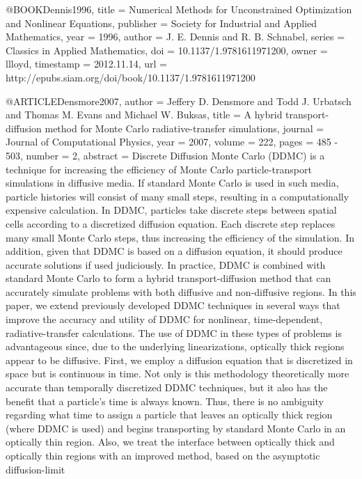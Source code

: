 {@BOOK{Dennis1996,
  title = {Numerical Methods for Unconstrained Optimization and Nonlinear Equations},
  publisher = {Society for Industrial and Applied Mathematics},
  year = {1996},
  author = {J. E. Dennis and R. B. Schnabel},
  series = {Classics in Applied Mathematics},
  doi = {10.1137/1.9781611971200},
  owner = {llloyd},
  timestamp = {2012.11.14},
  url = {http://epubs.siam.org/doi/book/10.1137/1.9781611971200}
}

@ARTICLE{Densmore2007,
  author = {Jeffery D. Densmore and Todd J. Urbatsch and Thomas M. Evans and
	Michael W. Buksas},
  title = {A hybrid transport-diffusion method for Monte Carlo radiative-transfer
	simulations},
  journal = {Journal of Computational Physics},
  year = {2007},
  volume = {222},
  pages = {485 - 503},
  number = {2},
  abstract = {Discrete Diffusion Monte Carlo (DDMC) is a technique for increasing
	the efficiency of Monte Carlo particle-transport simulations in diffusive
	media. If standard Monte Carlo is used in such media, particle histories
	will consist of many small steps, resulting in a computationally
	expensive calculation. In DDMC, particles take discrete steps between
	spatial cells according to a discretized diffusion equation. Each
	discrete step replaces many small Monte Carlo steps, thus increasing
	the efficiency of the simulation. In addition, given that DDMC is
	based on a diffusion equation, it should produce accurate solutions
	if used judiciously. In practice, DDMC is combined with standard
	Monte Carlo to form a hybrid transport-diffusion method that can
	accurately simulate problems with both diffusive and non-diffusive
	regions. In this paper, we extend previously developed DDMC techniques
	in several ways that improve the accuracy and utility of DDMC for
	nonlinear, time-dependent, radiative-transfer calculations. The use
	of DDMC in these types of problems is advantageous since, due to
	the underlying linearizations, optically thick regions appear to
	be diffusive. First, we employ a diffusion equation that is discretized
	in space but is continuous in time. Not only is this methodology
	theoretically more accurate than temporally discretized DDMC techniques,
	but it also has the benefit that a particle's time is always known.
	Thus, there is no ambiguity regarding what time to assign a particle
	that leaves an optically thick region (where DDMC is used) and begins
	transporting by standard Monte Carlo in an optically thin region.
	Also, we treat the interface between optically thick and optically
	thin regions with an improved method, based on the asymptotic diffusion-limit
}}}
